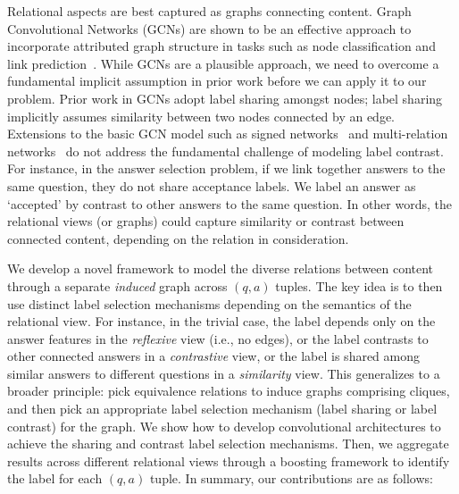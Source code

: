 Relational aspects are best captured as graphs connecting content. Graph Convolutional Networks (GCNs) are shown to be an effective approach to incorporate attributed graph structure in tasks such as node classification \cite{gcn} and link prediction~\cite{relationalGCN}. While GCNs are a plausible approach, we need to overcome a fundamental implicit assumption in prior work before we can apply it to our problem. Prior work in GCNs adopt label sharing amongst nodes; label sharing implicitly assumes similarity between two nodes connected by an edge. Extensions to the basic GCN model such as signed networks~\cite{signedgcn} and multi-relation networks~\cite{DualGCN,relationalGCN} do not address the fundamental challenge of modeling label contrast. For instance, in the answer selection problem, if we link together answers to the same question, they do not share acceptance labels. We label an answer as `accepted' by contrast to other answers to the same question. In other words, the relational views (or graphs) could capture similarity or contrast between connected content, depending on the relation in consideration.

We develop a novel framework to model the diverse relations between content through a separate \textit{induced} graph across $(q,a)$ tuples. The key idea is to then use distinct label selection mechanisms depending on the semantics of the relational view. For instance, in the trivial case, the label depends only on the answer features in the \textit{reflexive} view (i.e., no edges), or the label contrasts to other connected answers in a \textit{contrastive} view, or the label is shared among similar answers to different questions in a \textit{similarity} view. This generalizes to a broader principle: pick equivalence relations to induce graphs comprising cliques, and then pick an appropriate label selection mechanism (label sharing or label contrast) for the graph. We show how to develop convolutional architectures to achieve the sharing and contrast label selection mechanisms. Then, we aggregate results across different relational views through a boosting framework to identify the label for each $(q,a)$ tuple. In summary, our contributions are as follows:

